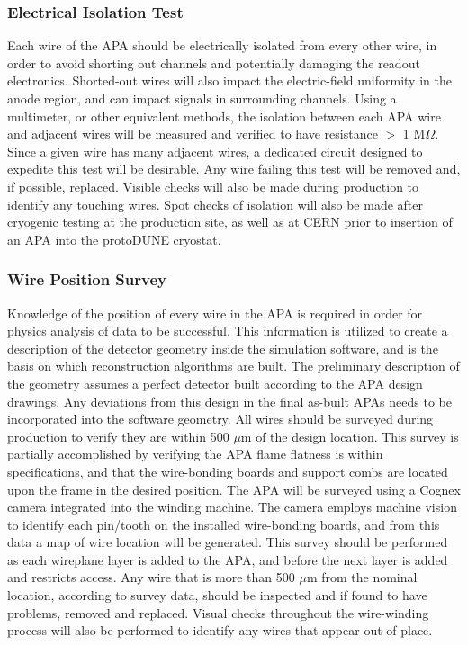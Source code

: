\subsubsection{Electrical Isolation Test}

Each wire of the APA should be electrically isolated from every other wire, in order to avoid shorting out channels and potentially damaging the readout electronics.  Shorted-out wires will also impact the electric-field uniformity in the anode region, and can impact signals in surrounding channels.  Using a multimeter, or other equivalent methods, the isolation between each APA wire and adjacent wires will be measured and verified to have resistance $>$ 1 M$\Omega$.  Since a given wire has many adjacent wires, a dedicated circuit designed to expedite this test will be desirable.  Any wire failing this test will be removed and, if possible, replaced.  Visible checks will also be made during production to identify any touching wires.  Spot checks of isolation will also be made after cryogenic testing at the production site, as well as at CERN prior to insertion of an APA into the protoDUNE cryostat.


\subsubsection{Wire Position Survey}

Knowledge of the position of every wire in the APA is required in order for physics analysis of data to be successful.  This information is utilized to create a description of the detector geometry inside the simulation software, and is the basis on which reconstruction algorithms are built. The preliminary description of the geometry assumes a perfect detector built according to the APA design drawings.  Any deviations from this design in the final as-built APAs needs to be incorporated into the software geometry.  All wires should be surveyed during production to verify they are within 500 $\mu$m of the design location.  This survey is partially accomplished by verifying the APA flame flatness is within specifications, and that the wire-bonding boards and support combs are located upon the frame in the desired position.  The APA will be surveyed using a Cognex camera integrated into the winding machine.  The camera employs machine vision to identify each pin/tooth on the installed wire-bonding boards, and from this data a map of wire location will be generated.  This survey should be performed as each wireplane layer is added to the APA, and before the next layer is added and restricts access.  Any wire that is more than 500 $\mu$m from the nominal location, according to survey data, should be inspected and if found to have problems, removed and replaced.  Visual checks throughout the wire-winding process will also be performed to identify any wires that appear out of place.

